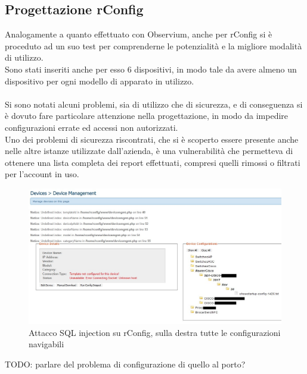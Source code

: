 \documentclass[Realizzazione.tex]{subfiles}
\begin{document}
\subsection{Progettazione rConfig}
Analogamente a quanto effettuato con Observium, anche per rConfig si è proceduto ad un suo test per comprenderne le potenzialità e la migliore modalità di utilizzo. \\
Sono stati inseriti anche per esso 6 dispositivi, in modo tale da avere almeno un dispositivo per ogni modello di apparato in utilizzo. \\\\
Si sono notati alcuni problemi, sia di utilizzo che di sicurezza, e di conseguenza si è dovuto fare particolare attenzione nella progettazione, in modo da impedire configurazioni errate ed accessi non autorizzati. \\
Uno dei problemi di sicurezza riscontrati, che si è scoperto essere presente anche nelle altre istanze utilizzate dall'azienda, è una vulnerabilità  che permetteva di ottenere una lista completa dei report effettuati, compresi quelli rimossi o filtrati per l'account in uso. \\
\begin{figure}[H]
	\centering
	\includegraphics[width=1\linewidth]{"images/rConfig_SQLi"}
	\caption{Attacco SQL injection su rConfig, sulla destra tutte le configurazioni navigabili}
	\label{fig:Attacco SQL injection su rConfig, sulla destra tutte le configurazioni navigabili}
\end{figure}
TODO: parlare del problema di configurazione di quello al porto?
\end{document}
